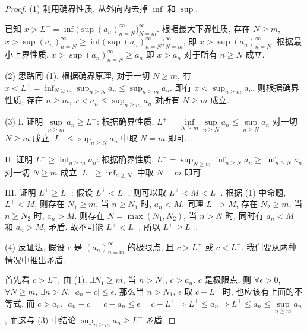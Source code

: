\documentclass[UTF8]{ctexart}
\theoremstyle{mystyle}
\theoremstyle{myremark}
\theoremstyle{plain}
\begin{document}
\begin{proof}
    (1) 利用确界性质, 从外向内去掉 $ \inf $ 和 $ \sup $. 
    
    已知 $ x > L^+ = \inf \Big( \sup (a_n)_{n = N}^\infty \Big)_{N = m}^\infty $. 根据最大下界性质, 存在 $ N \geqslant m $, $ x > \sup(a_n)_{n = N}^\infty \geqslant \inf \Big( \sup (a_n)_{n = N}^\infty \Big)_{N = m}^\infty $, 即 $ x > \sup (a_n)_{n = N}^\infty $. 根据最小上界性质, $ x > \sup (a_n)_{n = N}^\infty \geqslant a_n $ 即 $ x > a_n $ 对于所有 $ n \geqslant N $ 成立.

    (2) 思路同 (1). 根据确界原理, 对于一切 $ N \geqslant m $, 有 $ \displaystyle x < L^+ = \inf_{N \geqslant m} \sup_{n \geqslant N} a_n \leqslant \sup_{n \geqslant m} a_n $. 即有 $\displaystyle x < \sup_{n \geqslant m} a_n $, 则根据确界性质, 存在 $ n \geqslant m $, $\displaystyle x < a_n \leqslant \sup_{n \geqslant m} a_n $ 对所有 $ N \geqslant m $ 成立.

    (3) I. 证明 $ \sup\limits_{n \geqslant m} a_n \geqslant L^+ $: 根据确界性质, $ L^+ = \inf\limits_{N \geqslant m} \sup\limits_{n \geqslant N} a_n \leqslant \sup\limits_{n \geqslant N} a_n $ 对一切 $ N \geqslant m $ 成立. $ \displaystyle L^+ \leqslant \sup_{n \geqslant N} a_n $ 中取 $ N = m $ 即可.

    II. 证明 $ \displaystyle L^- \geqslant \inf_{n \geqslant m} a_n $: 根据确界性质, $ \displaystyle L^- = \sup_{N \geqslant m} \inf_{n \geqslant N} a_n \geqslant \inf_{n \geqslant N} a_n $ 对一切 $ N \geqslant m $ 成立. $ \displaystyle L^- \geqslant \inf_{n \geqslant N} $ 中取 $ N = m $ 即可.

    III. 证明 $ L^+ \geqslant L^- $: 假设 $ L^+ < L^- $, 则可以取 $ L^+ < M < L^- $. 根据 (1) 中命题, $ L^+ < M $, 则存在 $ N_1 \geqslant m $, 当 $ n \geqslant N_1 $ 时, $ a_n < M $. 同理 $ L^- > M $, 存在 $ N_2 \geqslant m $, 当 $ n \geqslant N_2 $ 时, $ a_n > M $. 则存在 $ N = \max (N_1, N_2) $, 当 $ n > N $ 时, 同时有 $ a_n < M $ 和 $ a_n > M $, 矛盾. 故不可能 $ L^+ < L^- $, 所以 $ L^+ \geqslant L^- $.

    (4) 反证法, 假设 $ c $ 是 $ (a_n)_{n = m}^\infty $ 的极限点, 且 $ c > L^+ $ 或 $ c < L^- $. 我们要从两种情况中推出矛盾. 
    
    首先看 $ c > L^+ $, 由 (1), $ \exists N_1 \geqslant m $, 当 $ n > N_1 $, $ c > a_n $. $ c $ 是极限点, 则 $ \forall \epsilon > 0 $, $ \forall N \geqslant m $, $ \exists n > N $, $ |a_n - c| \leqslant \epsilon $. 那么当 $ n > N_1 $, $ \epsilon $ 取 $ c - L^+ $ 时, 也应该有上面的不等式, 而 $ c > a_n $, $ |a_n - c| = c - a_n \leqslant \epsilon = c - L^+ \Longrightarrow L^+ \leqslant a_n \Longrightarrow L^+ \leqslant a_n \leqslant \sup\limits_{n \geqslant m} a_n $, 而这与 (3) 中结论 $ \displaystyle \sup_{n \geqslant m} a_n \geqslant L^+ $ 矛盾. 
    

\end{proof}
\end{document}
